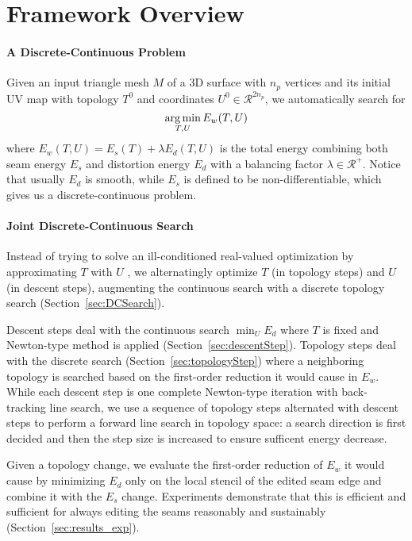 
\section{Framework Overview}

\paragraph{A Discrete-Continuous Problem}

Given an input triangle mesh $M$ of a 3D surface with $n_p$ vertices and its initial UV map with topology $T^0$ and coordinates $U^0 \in \mathcal{R}^{2n_p}$, we automatically search for
\[ \operatorname*{arg\,min}_{T,U} E_w(T,U) \]
where $E_w(T,U) = E_s(T) + \lambda E_d(T,U)$ is the total energy combining both seam energy $E_s$ and distortion energy $E_d$ with a balancing factor $\lambda \in \mathcal{R^+}$. Notice that usually $E_d$ is smooth, while $E_s$ is defined to be non-differentiable, which gives us a discrete-continuous problem.

\paragraph{Joint Discrete-Continuous Search}

Instead of trying to solve an ill-conditioned real-valued optimization by approximating $T$ with $U$ \cite{Poranne2017Autocuts}, we alternatingly optimize $T$ (in topology steps) and $U$ (in descent steps), augmenting the continuous search with a discrete topology search (Section~\ref{sec:DCSearch}).

Descent steps deal with the continuous search
$\min_U E_d$
where $T$ is fixed and Newton-type method is applied (Section~\ref{sec:descentStep}).
Topology steps deal with the discrete search (Section~\ref{sec:topologyStep}) where a neighboring topology is searched based on the first-order reduction it would cause in $E_w$.
While each descent step is one complete Newton-type iteration with back-tracking line search, we use a sequence of topology steps alternated with descent steps to perform a forward line search in topology space: a search direction is first decided and then the step size is increased to ensure sufficent energy decrease.

Given a topology change, we evaluate the first-order reduction of $E_w$ it would cause by minimizing $E_d$ only on the local stencil of the edited seam edge and combine it with the $E_s$ change. Experiments demonstrate that this is efficient and sufficient for always editing the seams reasonably and sustainably (Section~\ref{sec:results_exp}).

